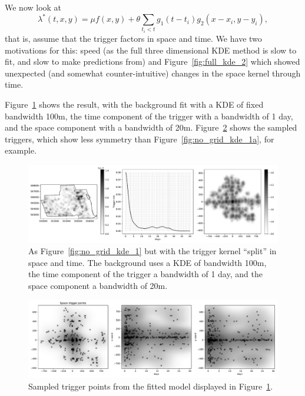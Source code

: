 \documentclass[twoside,a4paper]{article}
\theoremstyle{plain}
\theoremstyle{definition}
\begin{document}
We now look at
\[ \lambda^*(t,x,y) = \mu f(x,y) + \theta \sum_{t_i < t} g_1(t-t_i) g_2(x-x_i, y-y_i), \]
that is, assume that the trigger factors in space and time.  We have two motivations for this:
speed (as the full three dimensional KDE method is slow to fit, and slow to make predictions
from) and Figure~\ref{fig:full_kde_2} which showed unexpected (and somewhat counter-intuitive)
changes in the space kernel through time.

Figure~\ref{fig:no_grid_kde_split_1} shows the result, with the background fit with a KDE of
fixed bandwidth 100m, the time component of the trigger with a bandwidth of 1 day, and the
space component with a bandwidth of 20m.  Figure~\ref{fig:no_grid_kde_split_1a} shows the
sampled triggers, which show less symmetry than Figure~\ref{fig:no_grid_kde_1a}, for example.

\begin{figure}
  \includegraphics[width=\textwidth]{../notebooks/no_grid_kde_split_1.pdf}
  \caption{As Figure~\ref{fig:no_grid_kde_1} but with the trigger kernel ``split''
in space and time.  The background uses a KDE of bandwidth 100m, the time component of
the trigger a bandwidth of 1 day, and the space component a bandwidth of 20m.}
  \label{fig:no_grid_kde_split_1}
\end{figure}

\begin{figure}
  \includegraphics[width=\textwidth]{../notebooks/no_grid_kde_split_1a.pdf}
  \caption{Sampled trigger points from the fitted model displayed in
Figure~\ref{fig:no_grid_kde_split_1}.}
  \label{fig:no_grid_kde_split_1a}
\end{figure}
\end{document}
